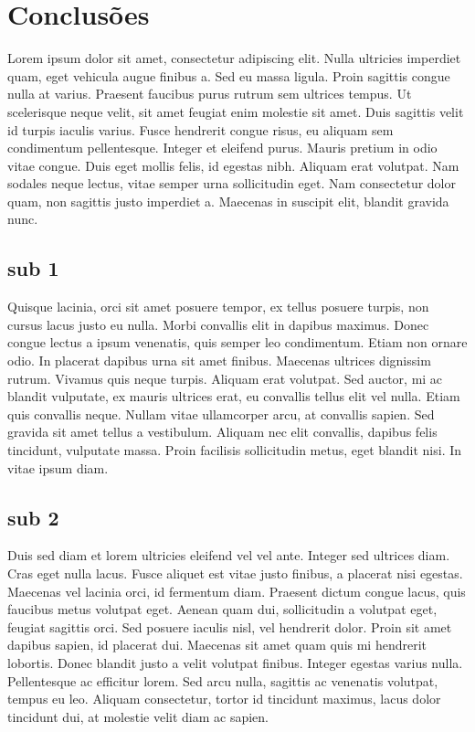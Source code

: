 \chapter{Conclusões}
Lorem ipsum dolor sit amet, consectetur adipiscing elit. Nulla ultricies imperdiet quam, eget vehicula augue finibus a. Sed eu massa ligula. Proin sagittis congue nulla at varius. Praesent faucibus purus rutrum sem ultrices tempus. Ut scelerisque neque velit, sit amet feugiat enim molestie sit amet. Duis sagittis velit id turpis iaculis varius. Fusce hendrerit congue risus, eu aliquam sem condimentum pellentesque. Integer et eleifend purus. Mauris pretium in odio vitae congue. Duis eget mollis felis, id egestas nibh. Aliquam erat volutpat. Nam sodales neque lectus, vitae semper urna sollicitudin eget. Nam consectetur dolor quam, non sagittis justo imperdiet a. Maecenas in suscipit elit, blandit gravida nunc.
\section{sub 1}
Quisque lacinia, orci sit amet posuere tempor, ex tellus posuere turpis, non cursus lacus justo eu nulla. Morbi convallis elit in dapibus maximus. Donec congue lectus a ipsum venenatis, quis semper leo condimentum. Etiam non ornare odio. In placerat dapibus urna sit amet finibus. Maecenas ultrices dignissim rutrum. Vivamus quis neque turpis. Aliquam erat volutpat. Sed auctor, mi ac blandit vulputate, ex mauris ultrices erat, eu convallis tellus elit vel nulla. Etiam quis convallis neque. Nullam vitae ullamcorper arcu, at convallis sapien. Sed gravida sit amet tellus a vestibulum. Aliquam nec elit convallis, dapibus felis tincidunt, vulputate massa. Proin facilisis sollicitudin metus, eget blandit nisi. In vitae ipsum diam.

\section{sub 2 }
Duis sed diam et lorem ultricies eleifend vel vel ante. Integer sed ultrices diam. Cras eget nulla lacus. Fusce aliquet est vitae justo finibus, a placerat nisi egestas. Maecenas vel lacinia orci, id fermentum diam. Praesent dictum congue lacus, quis faucibus metus volutpat eget. Aenean quam dui, sollicitudin a volutpat eget, feugiat sagittis orci. Sed posuere iaculis nisl, vel hendrerit dolor. Proin sit amet dapibus sapien, id placerat dui. Maecenas sit amet quam quis mi hendrerit lobortis. Donec blandit justo a velit volutpat finibus. Integer egestas varius nulla. Pellentesque ac efficitur lorem. Sed arcu nulla, sagittis ac venenatis volutpat, tempus eu leo. Aliquam consectetur, tortor id tincidunt maximus, lacus dolor tincidunt dui, at molestie velit diam ac sapien.
